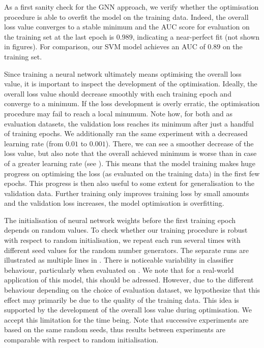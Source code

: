 \documentclass[
	fontsize=10pt, %
	twoside=false, %
	secnumdepth=1, %
  toc=indentunnumbered %
]{kaobook}
\begin{document}
As a first sanity check for the GNN approach, we verify whether the optimisation
procedure is able to overfit the model on the training data. Indeed, the overall
loss value converges to a stable minimum and the AUC score for evaluation on the
training set at the last epoch is $0.989$, indicating a near-perfect fit (not
shown in figures). For comparison, our SVM model achieves an AUC of $0.89$ on the
training set.


Since training a neural network ultimately means optimising the overall loss
value, it is important to inspect the development of the optimisation. Ideally,
the overall loss value should decrease smoothly with each training epoch and
converge to a minimum. If the loss development is overly erratic, the
optimisation procedure may fail to reach a local minumum.
Note how, for both \PDMap{} and \ReconMap{} as evaluation datasets, the
validation loss reaches its minimum after just a handful of training epochs. We
additionally ran the same experiment with a decreased learning rate (from $0.01$
to $0.001$). There, we can see a smoother decrease of the loss value, but also note
that the overall achieved minimum is worse than in case of a greater learning
rate (see ).
This means that the model training makes huge progress on optimising the loss
(as evaluated on the training data) in the first few epochs. This progress is then also
useful to some extent for generalisation to the validation data. Further
training only improves training loss by small amounts and the validation loss
increases, the model optimisation is overfitting.

The initialisation of neural network weights before the first training epoch
depends on random values. To check whether our training procedure is robust with
respect to random initialisation, we repeat each run several times with
different seed values for the random number generators. The separate runs are
illustrated as multiple lines in . There is noticeable
variability in classifier behaviour, particularly when evaluated on \ReconMap{}.
We note that for a real-world application of this model, this should be
adressed. However, due to the different behaviour depending on the choice of
evaluation dataset, we hypothesize that this effect may primarily be due to the
quality of the training data. This idea is supported by the development of the
overall loss value during optimisation. We accept this limitation for the time
being. Note that successive experiments are based on the same random seeds, thus
results between experiments are comparable with respect to random initialisation.
\end{document}
